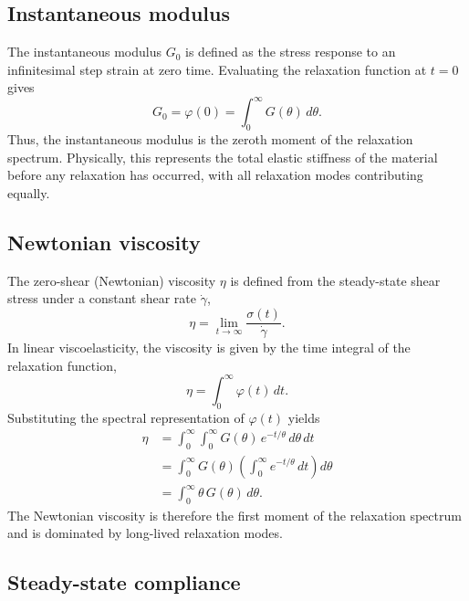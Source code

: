 \subsection{Instantaneous modulus}

The instantaneous modulus $G_0$ is defined as the stress response to an infinitesimal step strain at zero time. Evaluating the relaxation function at $t=0$ gives
\begin{equation}
	G_0 = \varphi(0) = \int_0^\infty G(\theta)\, d\theta.
\end{equation}
Thus, the instantaneous modulus is the zeroth moment of the relaxation spectrum. Physically, this represents the total elastic stiffness of the material before any relaxation has occurred, with all relaxation modes contributing equally.

\subsection{Newtonian viscosity}

The zero-shear (Newtonian) viscosity $\eta$ is defined from the steady-state shear stress under a constant shear rate $\dot\gamma$,
\begin{equation}
	\eta = \lim_{t \to \infty} \frac{\sigma(t)}{\dot\gamma}.
\end{equation}
In linear viscoelasticity, the viscosity is given by the time integral of the relaxation function,
\begin{equation}
	\eta = \int_0^\infty \varphi(t)\, dt.
\end{equation}
Substituting the spectral representation of $\varphi(t)$ yields
\begin{align}
	\eta
	&= \int_0^\infty \int_0^\infty G(\theta)\, e^{-t/\theta}\, d\theta\, dt \\
	&= \int_0^\infty G(\theta)
	\left( \int_0^\infty e^{-t/\theta}\, dt \right) d\theta \\
	&= \int_0^\infty \theta\, G(\theta)\, d\theta.
\end{align}
The Newtonian viscosity is therefore the first moment of the relaxation spectrum and is dominated by long-lived relaxation modes.

\subsection{Steady-state compliance}

